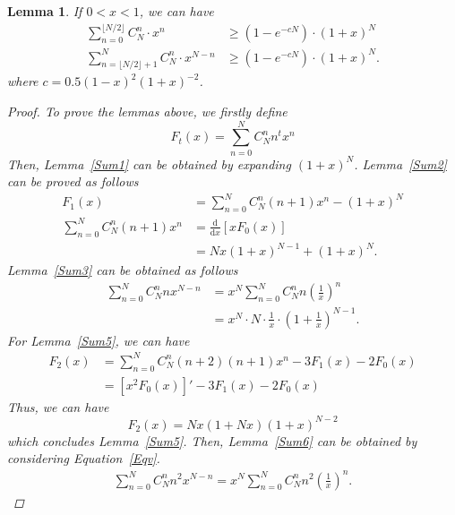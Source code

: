 \documentclass{article}
\newtheorem{lemma}[theorem]{Lemma}
\begin{document}
\begin{lemma}
\label{Sum4}
If $0<x<1$, we can have
\begin{equation*}
\begin{split}
\sum_{n=0}^{\lfloor N/2\rfloor} C_N^{n}\cdot x^{n} &\geq \left(1-e^{-cN}\right) \cdot (1+x)^{N}\\
\sum_{n=\lfloor N/2 \rfloor +1}^{N} C_N^{n}\cdot x^{N-n}&\geq \left(1-e^{-cN}\right) \cdot (1+x)^{N}.
\end{split}
\end{equation*}
where $c=0.5(1-x)^2(1+x)^{-2}$.
\begin{proof}
To prove the lemmas above, we firstly define
\begin{equation}
F_t(x)=\sum_{n=0}^{N} C_N^{n} n^t x^{n}
\end{equation}
Then, Lemma~\ref{Sum1} can be obtained by expanding $(1+x)^N$.
Lemma~\ref{Sum2} can be proved as follows
\begin{equation}
\begin{split}
F_1(x)&=\sum_{n=0}^{N} C_N^{n} (n+1) x^{n}-(1+x)^N\\
\sum_{n=0}^{N} C_N^{n} (n+1) x^{n}&=\frac{\mathrm{d}}{\mathrm{d}x}\left[xF_0(x)\right]\\
&=Nx(1+x)^{N-1}+(1+x)^N.
\end{split}
\end{equation}
Lemma~\ref{Sum3} can be obtained as follows
\begin{equation}
\begin{split}
\sum_{n=0}^{N} C_N^{n} n x^{N-n}&=x^N\sum_{n=0}^{N} C_N^{n} n \left(\frac{1}{x}\right)^n\\
&=x^N\cdot N\cdot \frac{1}{x}\cdot \left(1+\frac{1}{x}\right)^{N-1}.
\end{split}
\end{equation}
For Lemma~\ref{Sum5}, we can have
\begin{align}
F_2(x)&=\sum_{n=0}^{N} C_N^{n} (n+2)(n+1) x^{n}-3F_{1}(x)-2F_{0}(x)\nonumber \\
&=\left[x^2F_0(x)\right]' -3F_{1}(x)-2F_{0}(x)
\end{align}
Thus, we can have
\begin{equation}
F_2(x)=Nx(1+Nx)(1+x)^{N-2}
\end{equation}
which concludes Lemma~\ref{Sum5}.
Then, Lemma~\ref{Sum6} can be obtained by considering Equation~\ref{Eqv}.
\begin{equation}
\label{Eqv}
\begin{split}
\sum_{n=0}^{N} C_N^{n} n^2 x^{N-n}=x^N\sum_{n=0}^{N} C_N^{n} n^2 \left(\frac{1}{x}\right)^n.

\end{split}
\end{equation}
\end{proof}
\end{lemma}
\end{document}
